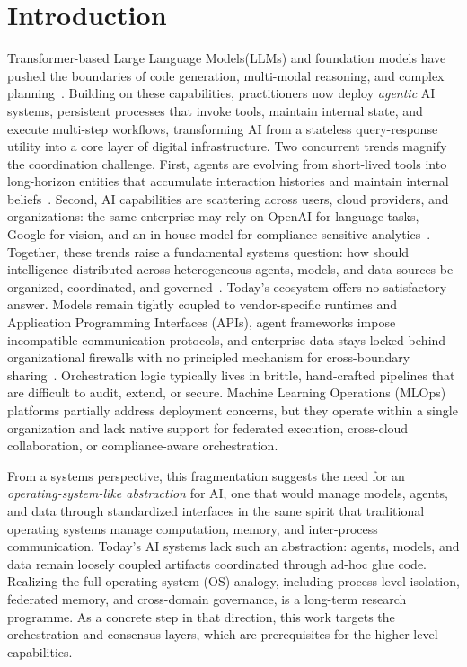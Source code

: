 \documentclass{iopjournal}
\begin{document}
\section{Introduction}\label{sec:intro}
Transformer-based Large Language Models(LLMs) and foundation models have pushed the boundaries of code generation, multi-modal reasoning, and complex planning~\cite{Kotei, chen2024evolution}. Building on these capabilities, practitioners now deploy \emph{agentic} AI systems, persistent processes that invoke tools, maintain internal state, and execute multi-step workflows, transforming AI from a stateless query-response utility into a core layer of digital infrastructure. Two concurrent trends magnify the coordination challenge. First, agents are evolving from short-lived tools into long-horizon entities that accumulate interaction histories and maintain internal beliefs~\cite{Liu}. Second, AI capabilities are scattering across users, cloud providers, and organizations: the same enterprise may rely on OpenAI for language tasks, Google for vision, and an in-house model for compliance-sensitive analytics~\cite{Davenport}. Together, these trends raise a fundamental systems question: how should intelligence distributed across heterogeneous agents, models, and data sources be organized, coordinated, and governed~\cite{zhu2023intelligent}. Today's ecosystem offers no satisfactory answer. Models remain tightly coupled to vendor-specific runtimes and Application Programming Interfaces (APIs), agent frameworks impose incompatible communication protocols, and enterprise data stays locked behind organizational firewalls with no principled mechanism for cross-boundary sharing~\cite{REALM}. Orchestration logic typically lives in brittle, hand-crafted pipelines that are difficult to audit, extend, or secure. Machine Learning Operations (MLOps) platforms partially address deployment concerns, but they operate within a single organization and lack native support for federated execution, cross-cloud collaboration, or compliance-aware orchestration.

From a systems perspective, this fragmentation suggests the need for an \emph{operating-system-like abstraction} for AI, one that would manage models, agents, and data through standardized interfaces in the same spirit that traditional operating systems manage computation, memory, and inter-process communication. Today's AI systems lack such an abstraction: agents, models, and data remain loosely coupled artifacts coordinated through ad-hoc glue code. Realizing the full operating system (OS) analogy, including process-level isolation, federated memory, and cross-domain governance, is a long-term research programme. As a concrete step in that direction, this work targets the orchestration and consensus layers, which are prerequisites for the higher-level capabilities.
\end{document}
